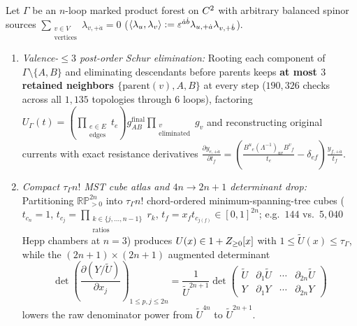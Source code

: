 \begin{theorem}
\label{thm:forest-cube-series}
Let $\Gamma$ be an $n$-loop marked product forest on $C^2$ with arbitrary balanced spinor sources $\sum_{\substack{v\in V\\\mathrm{vertices}}}\lambda_{v,+\dot{a}} = 0$ ($\langle\lambda_u,\lambda_v\rangle := \varepsilon^{\dot{a}\dot{b}}\lambda_{u,+\dot{a}}\lambda_{v,+\dot{b}}$).
\begin{enumerate}[label=(\arabic*),leftmargin=*]
  \item \emph{Valence-$\le 3$ post-order Schur elimination:} Rooting each component of $\Gamma\setminus\{A,B\}$ and eliminating descendants before parents keeps \textbf{at most $3$ retained neighbors $\{\mathrm{parent}(v), A, B\}$} at every step ($190{,}326$ checks across all $1{,}135$ topologies through $6$ loops), factoring $U_\Gamma(t) = (\prod_{\substack{e\in E\\\mathrm{edges}}}t_e)g_{AB}^{\mathrm{final}}\prod_{\substack{v\\\mathrm{eliminated}}}g_v$ and reconstructing original currents with exact resistance derivatives $\frac{\partial y_{e,+\dot{a}}}{\partial t_f} = (\frac{B^u{}_e(\Lambda^{-1})_{uv}B^v{}_f}{t_e} - \delta_{ef})\frac{y_{f,+\dot{a}}}{t_f}$.

  \item \emph{Compact $\tau_\Gamma n!$ MST cube atlas and $4n \to 2n+1$ determinant drop:} Partitioning $\mathbb{RP}^{2n}_{>0}$ into $\tau_\Gamma n!$ chord-ordered minimum-spanning-tree cubes ($t_{c_n}=1$, $t_{c_j}=\prod_{\substack{k\in\{j,\dots,n-1\}\\\mathrm{ratios}}}r_k$, $t_f = x_f t_{c_{j(f)}} \in [0,1]^{2n}$; e.g.\ $144$ vs.\ $5{,}040$ Hepp chambers at $n=3$) produces $U(x) \in 1 + Z_{\ge 0}[x]$ with $1 \le \widetilde{U}(x) \le \tau_\Gamma$, while the $(2n+1)\times(2n+1)$ augmented determinant
  \begin{equation}
  \label{eq:augmented-det-drop}
  \det\!\left(\frac{\partial(Y/\widetilde{U})}{\partial x_j}\right)_{1\le p,j\le 2n} = \frac{1}{\widetilde{U}^{2n+1}}\det\!\begin{pmatrix}\widetilde{U} & \partial_1\widetilde{U} & \cdots & \partial_{2n}\widetilde{U}\\ Y & \partial_1 Y & \cdots & \partial_{2n}Y\end{pmatrix}
  \end{equation}
  lowers the raw denominator power from $\widetilde{U}^{4n}$ to $\widetilde{U}^{2n+1}$.


\end{enumerate}
\end{theorem}
